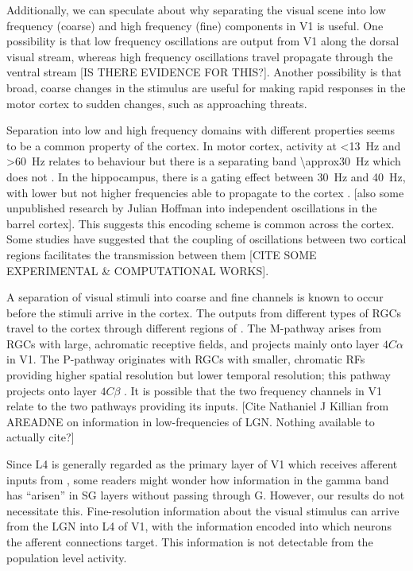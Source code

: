 Additionally, we can speculate about why separating the visual scene into low frequency (coarse) and high frequency (fine) components in \ac{V1} is useful.
One possibility is that low frequency oscillations are output from \ac{V1} along the dorsal visual stream, whereas high frequency oscillations travel propagate through the ventral stream [IS THERE EVIDENCE FOR THIS?].
Another possibility is that broad, coarse changes in the stimulus are useful for making rapid responses in the motor cortex to sudden changes, such as approaching threats.

Separation into low and high frequency domains with different properties seems to be a common property of the cortex.
In motor cortex, activity at \SI{<13}{Hz} and \SI{>60}{Hz} relates to behaviour but there is a separating band \SI{\approx30}{Hz} which does not \citep{Rickert2005}.
In the hippocampus, there is a gating effect between \SI{30}{Hz} and \SI{40}{Hz}, with lower but not higher frequencies able to propagate to the cortex \citep{Moreno2015}.
[also some unpublished research by Julian Hoffman into independent oscillations in the barrel cortex].
This suggests this encoding scheme is common across the cortex.
Some studies have suggested that the coupling of oscillations between two cortical regions facilitates the transmission between them [CITE SOME EXPERIMENTAL \& COMPUTATIONAL WORKS].

A separation of visual stimuli into coarse and fine channels is known to occur before the stimuli arrive in the cortex.
The outputs from different types of \acp{RGC} travel to the cortex through different regions of .
The M-pathway arises from \acp{RGC} with large, achromatic receptive fields, and projects mainly onto layer $4C\alpha$ in \ac{V1}.
The P-pathway originates with \acp{RGC} with smaller, chromatic \acp{RF} providing higher spatial resolution but lower temporal resolution; this pathway projects onto layer $4C\beta$ \citep{Callaway1998}.
It is possible that the two frequency channels in \ac{V1} relate to the two pathways providing its inputs.
[Cite Nathaniel J Killian from AREADNE on information in low-frequencies of \ac{LGN}.
Nothing available to actually cite?]

Since \ac{L4} is generally regarded as the primary layer of \ac{V1} which receives afferent inputs from , some readers might wonder how information in the gamma band has ``arisen'' in \ac{SG} layers without passing through \ac{G}.
However, our results do not necessitate this.
Fine-resolution information about the visual stimulus can arrive from the \ac{LGN} into \ac{L4} of \ac{V1}, with the information encoded into which neurons the afferent connections target.
This information is not detectable from the population level activity.


